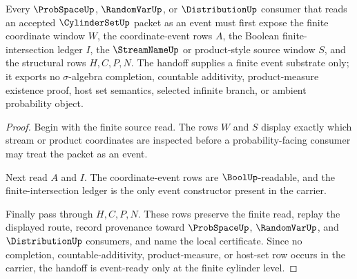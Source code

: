 \begin{theorem}
\label{thm:cylinder-set-probability-event-readiness}
Every $\ProbSpaceUp$, $\RandomVarUp$, or $\DistributionUp$ consumer that reads an accepted $\CylinderSetUp$ packet as an event must first expose the finite coordinate window $W$, the coordinate-event rows $A$, the Boolean finite-intersection ledger $I$, the $\StreamNameUp$ or product-style source window $S$, and the structural rows $H,C,P,N$. The handoff supplies a finite event substrate only; it exports no $\sigma$-algebra completion, countable additivity, product-measure existence proof, host set semantics, selected infinite branch, or ambient probability object.
\end{theorem}
\begin{proof}
Begin with the finite source read. The rows $W$ and $S$ display exactly which stream or product coordinates are inspected before a probability-facing consumer may treat the packet as an event.

Next read $A$ and $I$. The coordinate-event rows are $\BoolUp$-readable, and the finite-intersection ledger is the only event constructor present in the carrier.

Finally pass through $H,C,P,N$. These rows preserve the finite read, replay the displayed route, record provenance toward $\ProbSpaceUp$, $\RandomVarUp$, and $\DistributionUp$ consumers, and name the local certificate. Since no completion, countable-additivity, product-measure, or host-set row occurs in the carrier, the handoff is event-ready only at the finite cylinder level.
\end{proof}



